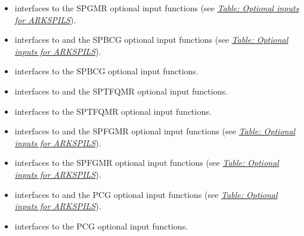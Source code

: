 \documentclass[letterpaper,10pt,english]{sphinxmanual}
\begin{document}
\begin{itemize}
\item {} 
{\hyperref[f_interface/Usage:f/_/FARKSPGMRREINIT]{}} interfaces to the SPGMR optional input
functions (see {\hyperref[c_interface/User_callable:cinterface-arkspilsinputtable]{\emph{Table: Optional inputs for ARKSPILS}}}).

\item {} 
{\hyperref[f_interface/Usage:f/_/FARKSPBCG]{}} interfaces to {\hyperref[c_interface/User_callable:ARKSpbcg]{}} and the SPBCG optional input
functions (see {\hyperref[c_interface/User_callable:cinterface-arkspilsinputtable]{\emph{Table: Optional inputs for ARKSPILS}}}).

\item {} 
{\hyperref[f_interface/Usage:f/_/FARKSPBCGREINIT]{}} interfaces to the SPBCG optional input
functions.

\item {} 
{\hyperref[f_interface/Usage:f/_/FARKSPTFQMR]{}} interfaces to {\hyperref[c_interface/User_callable:ARKSptfqmr]{}} and the SPTFQMR optional
input functions.

\item {} 
{\hyperref[f_interface/Usage:f/_/FARKSPTFQMRREINIT]{}} interfaces to the SPTFQMR optional input
functions.

\item {} 
{\hyperref[f_interface/Usage:f/_/FARKSPFGMR]{}} interfaces to {\hyperref[c_interface/User_callable:ARKSpfgmr]{}} and the SPFGMR optional input
functions (see {\hyperref[c_interface/User_callable:cinterface-arkspilsinputtable]{\emph{Table: Optional inputs for ARKSPILS}}}).

\item {} 
{\hyperref[f_interface/Usage:f/_/FARKSPFGMRREINIT]{}} interfaces to the SPFGMR optional input
functions (see {\hyperref[c_interface/User_callable:cinterface-arkspilsinputtable]{\emph{Table: Optional inputs for ARKSPILS}}}).

\item {} 
{\hyperref[f_interface/Usage:f/_/FARKPCG]{}} interfaces to {\hyperref[c_interface/User_callable:ARKPcg]{}} and the PCG optional input
functions (see {\hyperref[c_interface/User_callable:cinterface-arkspilsinputtable]{\emph{Table: Optional inputs for ARKSPILS}}}).

\item {} 
{\hyperref[f_interface/Usage:f/_/FARKPCGREINIT]{}} interfaces to the PCG optional input
functions.


\end{itemize}
\end{document}
